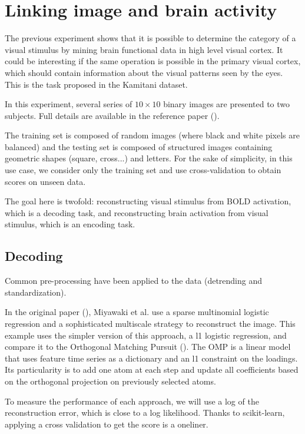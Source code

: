 \documentclass{frontiersSCNS} %
\begin{document}
\section{Linking image and brain activity}
\label{kamitani}

The previous experiment shows that it is possible to determine the category of a
visual stimulus by mining brain functional data in high level visual cortex. It
could be interesting if the same operation is possible in the primary visual
cortex, which should contain information about the visual patterns seen by the
eyes. This is the task proposed in the Kamitani dataset.

In this experiment, several series of $10\times10$ binary images are presented
to two subjects. Full details are available in the reference paper
(\cite{miyawaki2008}).

The training set is composed of random images (where black and white pixels
are balanced) and the testing set is composed of structured images containing
geometric shapes (square, cross...) and letters. For the sake of simplicity, in
this use case, we consider only the training set and use cross-validation to
obtain scores on unseen data.

The goal here is twofold: reconstructing visual stimulus from BOLD activation,
which is a decoding task, and reconstructing brain activation from visual
stimulus, which is an encoding task.

\subsection{Decoding}

Common pre-processing have been applied to the data (detrending and
standardization).

In the original paper (\cite{miyawaki2008}), Miyawaki et al. use a sparse multinomial
logistic regression and a sophisticated multiscale strategy to reconstruct the image.
This example uses the simpler version of this approach, a l1 logistic
regression, and compare it to the Orthogonal
Matching Pursuit (\cite{mallat1993}). The OMP is a linear model that uses
feature time series as a dictionary and an l1 constraint on the loadings. Its
particularity is to add one atom at each step and update all coefficients
based on the orthogonal projection on previously selected atoms.

To measure the performance of each approach, we will use a log of the
reconstruction error, which is close to a log likelihood. Thanks to
scikit-learn, applying a cross validation to get the score is a oneliner.
\end{document}
